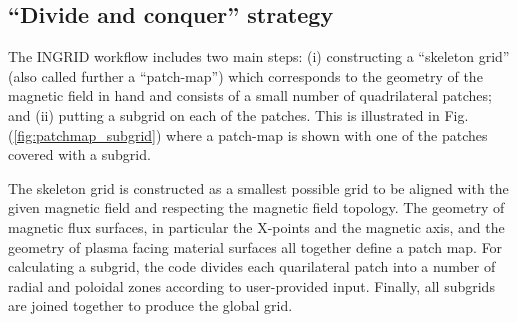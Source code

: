 \subsection{\label{sec:level2} ``Divide and conquer'' strategy}

The INGRID workflow includes two main steps: (i) constructing a
``skeleton grid'' (also called further a ``patch-map'') which
corresponds to the geometry of the magnetic field in hand and consists
of a small number of quadrilateral patches; and (ii) putting a subgrid
on each of the patches. This is illustrated in
Fig. (\ref{fig:patchmap_subgrid}) where a patch-map is shown with one
of the patches covered with a subgrid.

The skeleton grid is constructed as a smallest possible grid to be
aligned with the given magnetic field and respecting the magnetic
field topology. The geometry of magnetic flux surfaces, in particular
the X-points and the magnetic axis, and the geometry of plasma facing
material surfaces all together define a patch map. For calculating a
subgrid, the code divides each quarilateral patch into a number of
radial and poloidal zones according to user-provided input. Finally,
all subgrids are joined together to produce the global grid.
